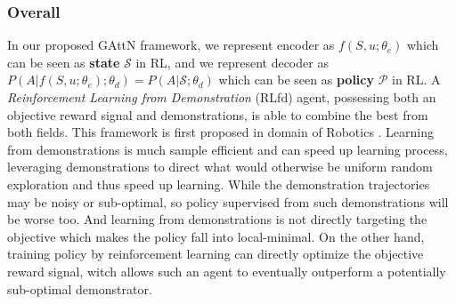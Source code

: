 \subsubsection{Overall}
In our proposed GAttN framework,
we represent encoder as $f(S,u;\theta_e)$ which can be seen as \textbf{state} $\mathcal{S}$ in RL,
and we represent decoder as $P(A|f(S,u;\theta_e);\theta_d)=P(A|\mathcal{S};\theta_d)$ which can be seen as \textbf{policy} $\mathcal{P}$ in RL. 
A \emph{Reinforcement Learning from Demonstration} (RLfd) agent, possessing
both an objective reward signal and demonstrations, is able to
combine the best from both fields.
This framework is first proposed in domain of Robotics \cite{nair2018overcoming}.
Learning from demonstrations is much sample efficient and can speed up learning process,
leveraging demonstrations to
direct what would otherwise be uniform random exploration and
thus speed up learning. 
While the demonstration trajectories may be noisy or sub-optimal,
so policy supervised from such demonstrations will be worse too.
And learning from demonstrations is not directly targeting the objective which makes the policy fall into local-minimal.
On the other hand,
training policy by reinforcement learning can directly optimize the objective reward signal,
witch allows such an agent to eventually outperform a
potentially sub-optimal demonstrator.

